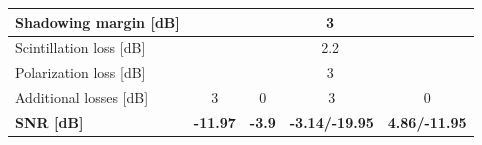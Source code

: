 \begin{table}
{\begin{tabular}{|l|cccc|}
            Shadowing margin {[}dB{]} & \multicolumn{4}{c|}{3} \\ \hline
            
            Scintillation loss {[}dB{]} & \multicolumn{4}{c|}{2.2} \\ \hline
            
            Polarization loss {[}dB{]} & \multicolumn{4}{c|}{3} \\ \hline
            
            Additional losses {[}dB{]} & \multicolumn{1}{c|}{3} & \multicolumn{1}{c|}{0} & \multicolumn{1}{c|}{3} & 0 \\ \hline
            
            \textbf{SNR {[}dB{]}} & \multicolumn{1}{c|}{\textbf{-11.97}} & \multicolumn{1}{c|}{\textbf{-3.9}} & \multicolumn{1}{c|}{\textbf{-3.14/-19.95}} & \textbf{4.86/-11.95} \\ \hline
    \end{tabular}%
    }
\end{table}

